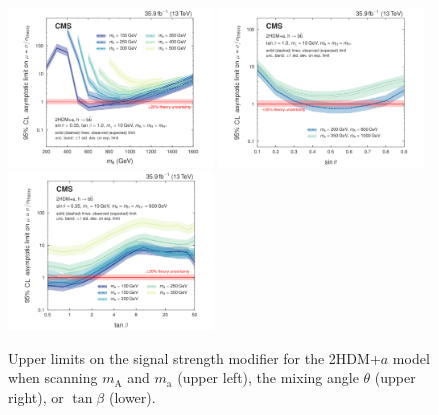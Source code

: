 \begin{figure}[htbp]
  \centering
  \includegraphics[width=0.485\textwidth]{figures/limits/limits_2hdma_mass.pdf}
  \includegraphics[width=0.485\textwidth]{figures/limits/limits_2hdma_sinp.pdf}\\
  \includegraphics[width=0.485\textwidth]{figures/limits/limits_2hdma_tanb.pdf}\\
  \caption{Upper limits on the signal strength modifier for the 2HDM+$a$ model when scanning $m_\text{A}$ and $m_\text{a}$ (upper left), the mixing angle $\theta$ (upper right), or $\tan\beta$ (lower).}
  \label{fig:limits_2hdma}
\end{figure}


